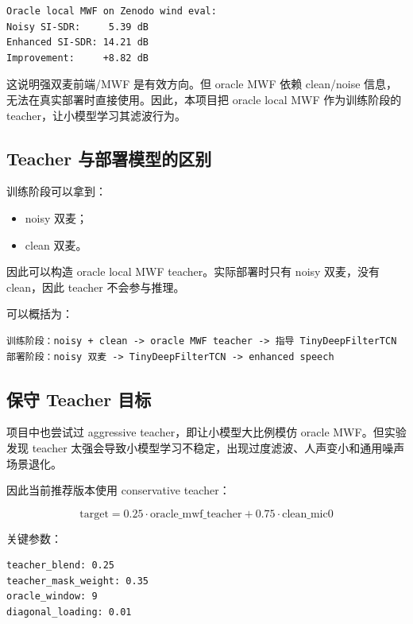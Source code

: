\documentclass[UTF8,12pt,a4paper]{ctexart}
\begin{document}
\begin{lstlisting}
Oracle local MWF on Zenodo wind eval:
Noisy SI-SDR:     5.39 dB
Enhanced SI-SDR: 14.21 dB
Improvement:     +8.82 dB
\end{lstlisting}

这说明强双麦前端/MWF 是有效方向。但 oracle MWF 依赖 clean/noise 信息，无法在真实部署时直接使用。因此，本项目把 oracle local MWF 作为训练阶段的 teacher，让小模型学习其滤波行为。

\subsection{Teacher 与部署模型的区别}

训练阶段可以拿到：

\begin{itemize}
  \item noisy 双麦；
  \item clean 双麦。
\end{itemize}

因此可以构造 oracle local MWF teacher。实际部署时只有 noisy 双麦，没有 clean，因此 teacher 不会参与推理。

可以概括为：

\begin{lstlisting}
训练阶段：noisy + clean -> oracle MWF teacher -> 指导 TinyDeepFilterTCN
部署阶段：noisy 双麦 -> TinyDeepFilterTCN -> enhanced speech
\end{lstlisting}

\subsection{保守 Teacher 目标}

项目中也尝试过 aggressive teacher，即让小模型大比例模仿 oracle MWF。但实验发现 teacher 太强会导致小模型学习不稳定，出现过度滤波、人声变小和通用噪声场景退化。

因此当前推荐版本使用 conservative teacher：

\begin{equation}
\text{target} = 0.25 \cdot \text{oracle\_mwf\_teacher} + 0.75 \cdot \text{clean\_mic0}
\end{equation}

关键参数：

\begin{lstlisting}
teacher_blend: 0.25
teacher_mask_weight: 0.35
oracle_window: 9
diagonal_loading: 0.01
\end{lstlisting}
\end{document}
